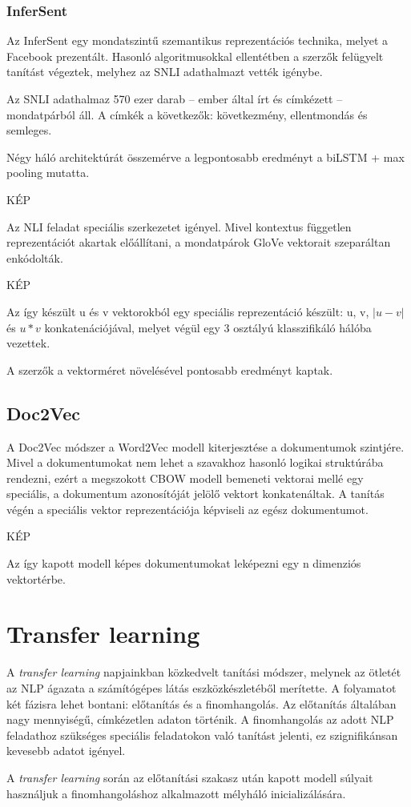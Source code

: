 \subsubsection{InferSent}
Az InferSent egy mondatszintű szemantikus reprezentációs technika, melyet a Facebook prezentált. Hasonló algoritmusokkal ellentétben a szerzők felügyelt tanítást végeztek, melyhez az SNLI adathalmazt vették igénybe.

Az SNLI adathalmaz 570 ezer darab – ember által írt és címkézett – mondatpárból áll. A címkék a következők: következmény, ellentmondás és semleges.

Négy háló architektúrát összemérve a legpontosabb eredményt a biLSTM + max pooling mutatta. 

KÉP

Az NLI feladat speciális szerkezetet igényel. Mivel kontextus független reprezentációt akartak előállítani, a mondatpárok GloVe vektorait szeparáltan enkódolták.

KÉP

Az így készült u és v vektorokból egy speciális reprezentáció készült: u, v, $\left| u - v \right|$ és $u \ast v$ konkatenációjával, melyet végül egy 3 osztályú klasszifikáló hálóba vezettek.

\begin{note}
	A szerzők a vektorméret növelésével pontosabb eredményt kaptak.
\end{note}

\subsection{Doc2Vec}
A Doc2Vec módszer a Word2Vec modell kiterjesztése a dokumentumok szintjére. Mivel a dokumentumokat nem lehet a szavakhoz hasonló logikai struktúrába rendezni, ezért a megszokott CBOW modell bemeneti vektorai mellé egy speciális, a dokumentum azonosítóját jelölő vektort konkatenáltak. A tanítás végén a speciális vektor reprezentációja képviseli az egész dokumentumot.

KÉP

Az így kapott modell képes dokumentumokat leképezni egy n dimenziós vektortérbe.

\section{Transfer learning}

A \textit{transfer learning} napjainkban közkedvelt tanítási módszer, melynek az ötletét az NLP ágazata a számítógépes látás eszközkészletéből merítette. A folyamatot két fázisra lehet bontani: előtanítás és a finomhangolás. Az előtanítás általában nagy mennyiségű, címkézetlen adaton történik. A finomhangolás az adott NLP feladathoz szükséges speciális feladatokon való tanítást jelenti, ez szignifikánsan kevesebb adatot igényel.

A \textit{transfer learning} során az előtanítási szakasz után kapott modell súlyait használjuk a finomhangoláshoz alkalmazott mélyháló inicializálására.





